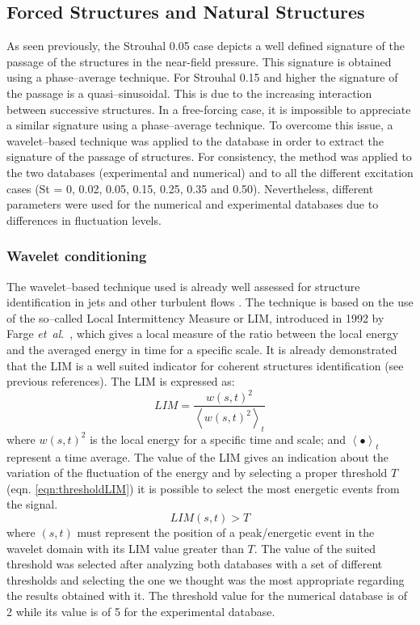 \documentclass[english]{aiaa-tc}
\newcommand*{\etal}{\textit{et~al}.\ }
\begin{document}
\subsection{Forced Structures and Natural Structures}%
As seen previously, the Strouhal 0.05 case depicts a well defined signature of the passage of the structures in the near-field pressure. This signature is obtained using a phase--average technique. For Strouhal 0.15 and higher the signature of the passage is a quasi--sinusoidal. This is due to the increasing interaction between successive structures. In a free-forcing case, it is impossible to appreciate a similar signature using a phase--average technique. To overcome this issue, a wavelet--based technique was applied to the database in order to extract the signature of the passage of structures. For consistency, the method was applied to the two databases (experimental and numerical) and to all the different excitation cases (St = 0, 0.02, 0.05, 0.15, 0.25, 0.35 and 0.50). Nevertheless, different parameters were used for the numerical and experimental databases due to differences in fluctuation levels.

\subsubsection{Wavelet conditioning}
The wavelet--based technique used is already well assessed for structure identification in jets and other turbulent flows \cite{Camussi1997,Camussi1997b,Guj1999,Camussi2002,Guj2003}. 
The technique is based on the use of the so--called Local Intermittency Measure or LIM, introduced in 1992 by Farge \etal \cite{Farge1992}, which gives a local measure of the ratio between the local energy and the averaged energy in time for a specific scale. 
It is already demonstrated that the LIM is a well suited indicator for coherent structures identification (see previous references). 
The LIM is expressed as:
\begin{equation}
	\label{eqn:LIM}
	LIM = \frac{w(s, t)^{2}}{\left<w(s, t)^{2}\right>_{t}}
\end{equation}
where $w(s, t)^{2}$ is the local energy for a specific time and scale; and $\left< \bullet \right>_{t}$ represent a time average.
The value of the LIM gives an indication about the variation of the fluctuation of the energy and by selecting a proper threshold $T$  (eqn. \ref{eqn:thresholdLIM}) it is possible to select the most energetic events from the signal.
\begin{equation} \label{eqn:thresholdLIM}
	LIM(s, t) > T
\end{equation}
where $(s, t)$ must represent the position of a peak/energetic event in the wavelet domain with its LIM value greater than $T$.
The value of the suited threshold was selected after analyzing both databases with a set of different thresholds and selecting the one we thought was the most appropriate regarding the results obtained with it. 
The threshold value for the numerical database is of 2 while its value is of 5 for the experimental database.
\end{document}
